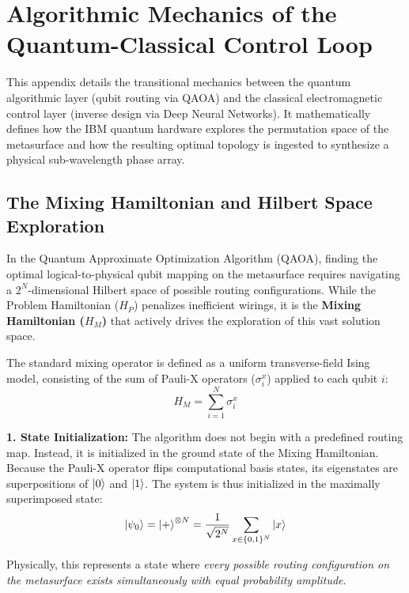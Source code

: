 \documentclass[11pt, a4paper]{article}
\begin{document}
\newpage
\appendix
\section{Algorithmic Mechanics of the Quantum-Classical Control Loop}

This appendix details the transitional mechanics between the quantum algorithmic layer (qubit routing via QAOA) and the classical electromagnetic control layer (inverse design via Deep Neural Networks). It mathematically defines how the IBM quantum hardware explores the permutation space of the metasurface and how the resulting optimal topology is ingested to synthesize a physical sub-wavelength phase array.

\subsection{The Mixing Hamiltonian and Hilbert Space Exploration}

In the Quantum Approximate Optimization Algorithm (QAOA), finding the optimal logical-to-physical qubit mapping on the metasurface requires navigating a $2^N$-dimensional Hilbert space of possible routing configurations. While the Problem Hamiltonian ($H_P$) penalizes inefficient wirings, it is the \textbf{Mixing Hamiltonian ($H_M$)} that actively drives the exploration of this vast solution space.

The standard mixing operator is defined as a uniform transverse-field Ising model, consisting of the sum of Pauli-X operators ($\sigma_i^x$) applied to each qubit $i$:
\begin{equation}
H_M = \sum_{i=1}^{N} \sigma_i^x
\end{equation}

\textbf{1. State Initialization:} The algorithm does not begin with a predefined routing map. Instead, it is initialized in the ground state of the Mixing Hamiltonian. Because the Pauli-X operator flips computational basis states, its eigenstates are superpositions of $\ket{0}$ and $\ket{1}$. The system is thus initialized in the maximally superimposed state:
\begin{equation}
\ket{\psi_0} = \ket{+}^{\otimes N} = \frac{1}{\sqrt{2^N}} \sum_{x \in \{0,1\}^N} \ket{x}
\end{equation}

Physically, this represents a state where \textit{every possible routing configuration on the metasurface exists simultaneously with equal probability amplitude}.
\end{document}
